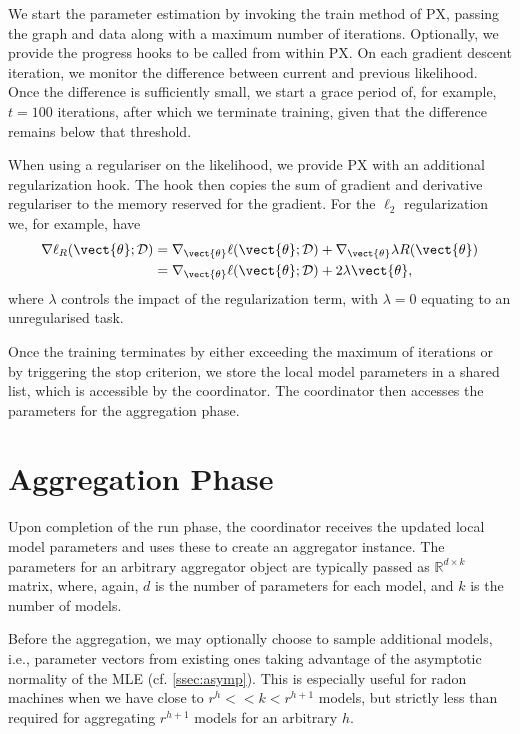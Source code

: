 We start the parameter estimation by invoking the train method of PX, passing the graph and data along with a maximum number of iterations.
Optionally, we provide the progress hooks to be called from within PX.
On each gradient descent iteration, we monitor the difference between current and previous likelihood. 
Once the difference is sufficiently small, we start a grace period of, for example, $t=100$ iterations, after which we terminate training, given that the difference remains below that threshold.

When using a regulariser on the likelihood, we provide PX with an additional regularization hook. 
The hook then copies the sum of gradient and derivative regulariser to the memory reserved for the gradient.
For the $\ell_2$ regularization we, for example, have 
\begin{equation}
    \begin{split}
    \nabla \ell_R( \vect{\theta}; \mathcal{D}) &= \nabla_{\vect{\theta}} \ell( \vect{\theta}; \mathcal{D}) +  \nabla_{\vect{\theta}}\lambda R(\vect{\theta}) \\
    &=\nabla_{\vect{\theta}} \ell( \vect{\theta}; \mathcal{D}) +  2\lambda \vect{\theta},
    \end{split}
\end{equation} 
where $\lambda$ controls the impact of the regularization term, with $\lambda=0$ equating to an unregularised task.

Once the training terminates by either exceeding the maximum of iterations or by triggering the stop criterion, we store the local model parameters in a shared list, which is accessible by the coordinator. 
The coordinator then accesses the parameters for the aggregation phase.


\section{Aggregation Phase}
Upon completion of the run phase, the coordinator receives the updated local model parameters and uses these to create an aggregator instance.
The parameters for an arbitrary aggregator object are typically passed as $\mathbb{R}^{d \times k}$ matrix, where, again, $d$ is the number of parameters for each model, and $k$ is the number of models.

Before the aggregation, we may optionally choose to sample additional models, i.e., parameter vectors from existing ones taking advantage of the asymptotic normality of the MLE (cf. \autoref{ssec:asymp}).
This is especially useful for radon machines when we have close to $ r^h << k < r^{h+1}$ models, but strictly less than required for aggregating $r^{h+1}$ models for an arbitrary $h$.

